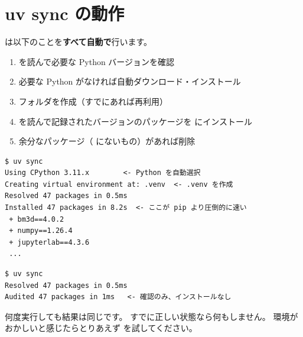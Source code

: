 \section{uv sync の動作}

 は以下のことを\textbf{すべて自動で}行います。

\begin{enumerate}
  \item {} を読んで必要な Python バージョンを確認
  \item 必要な Python がなければ自動ダウンロード・インストール
  \item {} フォルダを作成（すでにあれば再利用）
  \item {} を読んで記録されたバージョンのパッケージを
     にインストール
  \item 余分なパッケージ（ にないもの）があれば削除
\end{enumerate}

\begin{wslbox}
\begin{lstlisting}[style=bash]
$ uv sync
Using CPython 3.11.x        <- Python を自動選択
Creating virtual environment at: .venv  <- .venv を作成
Resolved 47 packages in 0.5ms
Installed 47 packages in 8.2s  <- ここが pip より圧倒的に速い
 + bm3d==4.0.2
 + numpy==1.26.4
 + jupyterlab==4.3.6
 ...
\end{lstlisting}
\end{wslbox}

\begin{wslbox}
\begin{lstlisting}[style=bash]
$ uv sync
Resolved 47 packages in 0.5ms
Audited 47 packages in 1ms   <- 確認のみ、インストールなし
\end{lstlisting}
\end{wslbox}

\begin{notebox}[uv sync は「冪等」]
何度実行しても結果は同じです。
すでに正しい状態なら何もしません。
環境がおかしいと感じたらとりあえず  を試してください。
\end{notebox}
